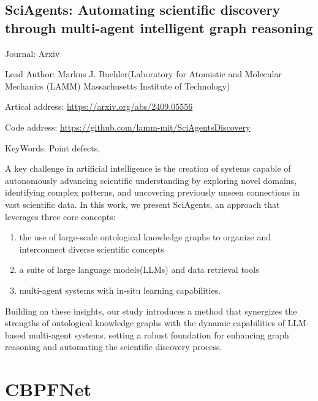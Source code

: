 \documentclass[11pt]{elegantbook}
\begin{document}
\subsection{SciAgents: Automating scientific discovery through multi-agent intelligent graph reasoning}
\begin{brief}
    \item Journal: Arxiv
    \item Lead Author: Markus J. Buehler(Laboratory for Atomistic and Molecular Mechanics (LAMM) Massachusetts Institute of Technology)
    \item Artical address: \href{https://arxiv.org/abs/2409.05556}{https://arxiv.org/abs/2409.05556}
    \item Code address: \href{https://github.com/lamm-mit/SciAgentsDiscovery}{https://github.com/lamm-mit/SciAgentsDiscovery}
    \item KeyWords: Point defects, 
\end{brief}
A key challenge in artificial intelligence is the creation of systems capable of autonomously advancing scientific understanding by exploring novel domains, identifying complex patterns, and uncovering previously unseen connections in vast scientific data. In this work, we present SciAgents, an approach that leverages three core concepts: 
\begin{enumerate}
    \item the use of large-scale ontological knowledge graphs to organize and interconnect diverse scientific concepts
    \item a suite of large language models(LLMs) and data retrieval tools
    \item multi-agent systems with in-situ learning capabilities.
\end{enumerate}

Building on these insights, our study introduces a method that synergizes the strengths of ontological knowledge graphs with the dynamic capabilities of LLM-based multi-agent systems, setting a robust foundation for enhancing graph reasoning and automating the scientific discovery process.




\section{CBPFNet}
\end{document}
